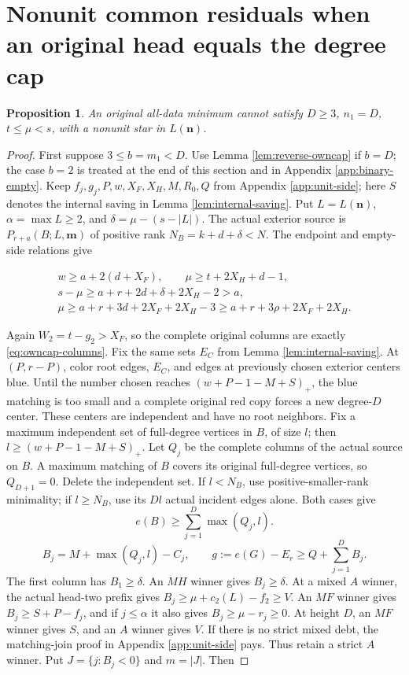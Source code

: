 \documentclass[11pt,a4paper]{article}
\newcommand{\nn}{\mathbf n}\newcommand{\mm}{\mathbf m}
\newtheorem{proposition}[theorem]{Proposition}
\theoremstyle{definition}
\begin{document}
\section{Nonunit common residuals when an original head equals the degree cap}\label{app:nonunit-side}
\begin{proposition}\label{prop:nonunit-single}
An original all-data minimum cannot satisfy
$D\ge3$, $n_1=D$, $t\le\mu<s$, with a nonunit star in $L(\nn)$.
\end{proposition}
\begin{proof}
First suppose $3\le b=m_1<D$.
Use Lemma \ref{lem:reverse-owncap} if $b=D$; the case $b=2$ is treated at the end of this section and in Appendix \ref{app:binary-empty}.
Keep $f_j,g_j,P,w,X_F,X_H,M,R_0,Q$ from Appendix \ref{app:unit-side};
here $S$ denotes the internal saving in Lemma \ref{lem:internal-saving}.
Put $L=L(\nn)$, $\alpha=\max L\ge2$, and $\delta=\mu-(s-|L|)$.
The actual exterior source is $P_{r+a}(B;L,\mm)$ of positive rank $N_B=k+d+\delta<N$.
The endpoint and empty-side relations give

\begin{equation}\label{eq:nonunit-guards}
\begin{gathered}
 w\ge a+2(d+X_F),\qquad
 \mu\ge t+2X_H+d-1,\\
 s-\mu\ge a+r+2d+\delta+2X_H-2>a,\\
 \mu\ge a+r+3d+2X_F+2X_H-3
 \ge a+r+3\rho+2X_F+2X_H.
\end{gathered}
\end{equation}

Again $W_2=t-g_2>X_F$, so the complete original columns are exactly \eqref{eq:owncap-columns}.
Fix the same sets $E_C$ from Lemma \ref{lem:internal-saving}.
At $(P,r-P)$, color root edges, $E_C$, and edges at previously chosen exterior centers blue.
Until the number chosen reaches $(w+P-1-M+S)_+$, the blue matching is too small and a complete original red copy forces a new degree-$D$ center.
These centers are independent and have no root neighbors.
Fix a maximum independent set of full-degree vertices in $B$, of size $l$; then $l\ge(w+P-1-M+S)_+$.
Let $Q_j$ be the complete columns of the actual source on $B$.
A maximum matching of $B$ covers its original full-degree vertices, so $Q_{D+1}=0$.
Delete the independent set. If $l<N_B$, use positive-smaller-rank minimality; if $l\ge N_B$, use its $Dl$ actual incident edges alone.
Both cases give
\[
 e(B)\ge\sum_{j=1}^{D}\max(Q_j,l).
\]
\[
 B_j=M+\max(Q_j,l)-C_j,\qquad
 g:=e(G)-E_r\ge Q+\sum_{j=1}^{D}B_j.
\]
The first column has $B_1\ge\delta$.
An $MH$ winner gives $B_j\ge\delta$.
At a mixed $A$ winner, the actual head-two prefix gives $B_j\ge\mu+c_2(L)-f_2\ge V$.
An $MF$ winner gives $B_j\ge S+P-f_j$, and if $j\le\alpha$ it also gives $B_j\ge\mu-r_j\ge0$.
At height $D$, an $MF$ winner gives $S$, and an $A$ winner gives $V$.
If there is no strict mixed debt, the matching-join proof in Appendix \ref{app:unit-side} pays.
Thus retain a strict $A$ winner.
Put $J=\{j:B_j<0\}$ and $m=|J|$. Then


\end{proof}
\end{document}
